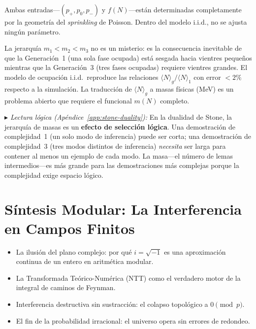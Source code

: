 \documentclass[11pt, a4paper, openany]{book}
\newcommand{\stoneref}[1]{%
  \smallskip\noindent
  {\small\color{structure!70}\textit{$\blacktriangleright$ Lectura
  l\'ogica (Ap\'endice~\ref{app:stone-duality}):} #1}%
  \smallskip}
\newenvironment{introduction}[1][Sinopsis del M\'odulo]{%
  \begin{tcolorbox}[
    enhanced,colback=structure!5,colframe=structure,
    colbacktitle=structure,coltitle=white,
    fonttitle=\small\bfseries,title={#1},
    arc=2pt,boxrule=0.7pt,
    left=8pt,right=8pt,top=6pt,bottom=6pt,
    before skip=12pt,after skip=12pt
  ]\itshape\begin{itemize}[leftmargin=*,itemsep=2pt,parsep=0pt]
}{%
  \end{itemize}\end{tcolorbox}
}
\begin{document}
\medskip
Ambas entradas---$(p_+, p_0, p_-)$ y $f(N)$---est\'an determinadas
completamente por la geometr\'ia del \emph{sprinkling} de Poisson.
Dentro del modelo i.i.d., no se ajusta ning\'un par\'ametro.

\begin{result}[title={La jerarqu\'ia de masas es un efecto de ocupaci\'on}]
\label{res:mass-hierarchy-occupancy}
La jerarqu\'ia $m_1 < m_2 < m_3$ no es un misterio: es la
consecuencia inevitable de que la Generaci\'on~1 (una sola fase
ocupada) est\'a sesgada hacia vientres peque\~nos mientras que la
Generaci\'on~3 (tres fases ocupadas) requiere vientres grandes. El
modelo de ocupaci\'on i.i.d.\ reproduce las relaciones
$\langle N\rangle_g / \langle N\rangle_1$ con error $< 2\%$
respecto a la simulaci\'on. La traducci\'on de $\langle N\rangle_g$
a masas f\'isicas (MeV) es un problema abierto que requiere el
funcional $m(N)$ completo.
\end{result}

\stoneref{En la dualidad de Stone, la jerarqu\'ia de masas es un
\textbf{efecto de selecci\'on l\'ogica}. Una demostraci\'on de
complejidad~1 (un solo modo de inferencia) puede ser corta; una
demostraci\'on de complejidad~3 (tres modos distintos de inferencia)
\emph{necesita} ser larga para contener al menos un ejemplo de cada
modo. La masa---el n\'umero de lemas intermedios---es m\'as grande para
las demostraciones m\'as complejas porque la complejidad exige espacio
l\'ogico.}



\chapter{S\'intesis Modular: La Interferencia en Campos Finitos}
\label{ch:modulo-synthesis}

\begin{introduction}
  \item La ilusi\'on del plano complejo: por qu\'e $i = \sqrt{-1}$ es una
        aproximaci\'on continua de un entero en aritm\'etica modular.
  \item La Transformada Te\'orico-Num\'erica (NTT) como el verdadero motor de la
        integral de caminos de Feynman.
  \item Interferencia destructiva sin sustracci\'on: el colapso topol\'ogico a $0 \pmod p$.
  \item El fin de la probabilidad irracional: el universo opera sin errores de redondeo.
\end{introduction}
\end{document}
